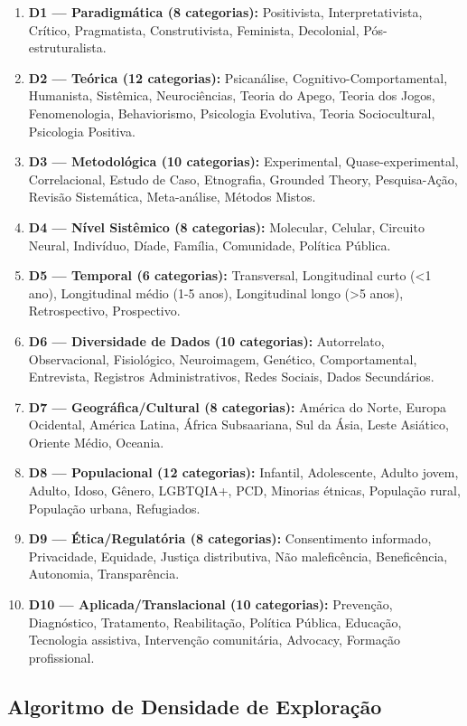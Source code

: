 \begin{enumerate}
  \item \textbf{D1 — Paradigmática (8 categorias):} Positivista, Interpretativista, Crítico, Pragmatista, Construtivista, Feminista, Decolonial, Pós-estruturalista.
  \item \textbf{D2 — Teórica (12 categorias):} Psicanálise, Cognitivo-Comportamental, Humanista, Sistêmica, Neurociências, Teoria do Apego, Teoria dos Jogos, Fenomenologia, Behaviorismo, Psicologia Evolutiva, Teoria Sociocultural, Psicologia Positiva.
  \item \textbf{D3 — Metodológica (10 categorias):} Experimental, Quase-experimental, Correlacional, Estudo de Caso, Etnografia, Grounded Theory, Pesquisa-Ação, Revisão Sistemática, Meta-análise, Métodos Mistos.
  \item \textbf{D4 — Nível Sistêmico (8 categorias):} Molecular, Celular, Circuito Neural, Indivíduo, Díade, Família, Comunidade, Política Pública.
  \item \textbf{D5 — Temporal (6 categorias):} Transversal, Longitudinal curto (<1 ano), Longitudinal médio (1-5 anos), Longitudinal longo (>5 anos), Retrospectivo, Prospectivo.
  \item \textbf{D6 — Diversidade de Dados (10 categorias):} Autorrelato, Observacional, Fisiológico, Neuroimagem, Genético, Comportamental, Entrevista, Registros Administrativos, Redes Sociais, Dados Secundários.
  \item \textbf{D7 — Geográfica/Cultural (8 categorias):} América do Norte, Europa Ocidental, América Latina, África Subsaariana, Sul da Ásia, Leste Asiático, Oriente Médio, Oceania.
  \item \textbf{D8 — Populacional (12 categorias):} Infantil, Adolescente, Adulto jovem, Adulto, Idoso, Gênero, LGBTQIA+, PCD, Minorias étnicas, População rural, População urbana, Refugiados.
  \item \textbf{D9 — Ética/Regulatória (8 categorias):} Consentimento informado, Privacidade, Equidade, Justiça distributiva, Não maleficência, Beneficência, Autonomia, Transparência.
  \item \textbf{D10 — Aplicada/Translacional (10 categorias):} Prevenção, Diagnóstico, Tratamento, Reabilitação, Política Pública, Educação, Tecnologia assistiva, Intervenção comunitária, Advocacy, Formação profissional.
\end{enumerate}

\subsection{Algoritmo de Densidade de Exploração}

